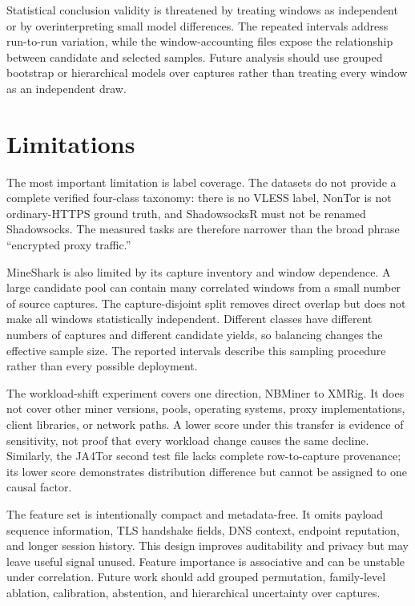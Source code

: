 \documentclass[conference]{IEEEtran}
\begin{document}
Statistical conclusion validity is threatened by treating windows as independent or by overinterpreting small model differences. The repeated intervals address run-to-run variation, while the window-accounting files expose the relationship between candidate and selected samples. Future analysis should use grouped bootstrap or hierarchical models over captures rather than treating every window as an independent draw.

\section{Limitations}
The most important limitation is label coverage. The datasets do not provide a complete verified four-class taxonomy: there is no VLESS label, NonTor is not ordinary-HTTPS ground truth, and ShadowsocksR must not be renamed Shadowsocks. The measured tasks are therefore narrower than the broad phrase “encrypted proxy traffic.”

MineShark is also limited by its capture inventory and window dependence. A large candidate pool can contain many correlated windows from a small number of source captures. The capture-disjoint split removes direct overlap but does not make all windows statistically independent. Different classes have different numbers of captures and different candidate yields, so balancing changes the effective sample size. The reported intervals describe this sampling procedure rather than every possible deployment.

The workload-shift experiment covers one direction, NBMiner to XMRig. It does not cover other miner versions, pools, operating systems, proxy implementations, client libraries, or network paths. A lower score under this transfer is evidence of sensitivity, not proof that every workload change causes the same decline. Similarly, the JA4Tor second test file lacks complete row-to-capture provenance; its lower score demonstrates distribution difference but cannot be assigned to one causal factor.

The feature set is intentionally compact and metadata-free. It omits payload sequence information, TLS handshake fields, DNS context, endpoint reputation, and longer session history. This design improves auditability and privacy but may leave useful signal unused. Feature importance is associative and can be unstable under correlation. Future work should add grouped permutation, family-level ablation, calibration, abstention, and hierarchical uncertainty over captures.
\end{document}
